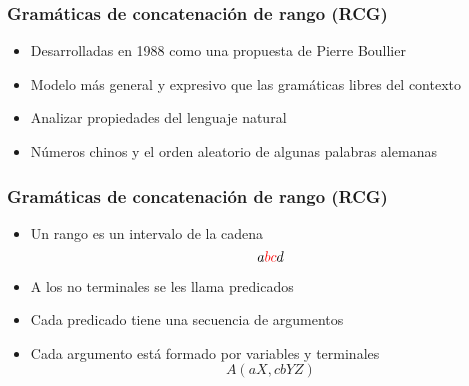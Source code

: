 \documentclass{beamer}
\begin{document}
\begin{frame}
    \frametitle{Gramáticas de concatenación de rango (RCG)}

    \begin{itemize}
        \item Desarrolladas  en 1988 como una propuesta de Pierre Boullier
              \pause
        \item Modelo más general y expresivo que las gramáticas libres del contexto
              \pause
        \item Analizar propiedades del lenguaje natural
              \pause
        \item Números chinos y el orden aleatorio de algunas palabras alemanas
    \end{itemize}
\end{frame}

\begin{frame}
    \frametitle{Gramáticas de concatenación de rango (RCG)}

    \begin{itemize}
        \item Un rango es un intervalo de la cadena
              $$a\textcolor{red}{bc}d$$
              \pause
        \item A los no terminales se les llama predicados
              \pause
        \item Cada predicado tiene una secuencia de argumentos
              \pause
        \item Cada argumento está formado por variables y terminales
              $$A(aX,cbYZ)$$
    \end{itemize}
\end{frame}
\end{document}

